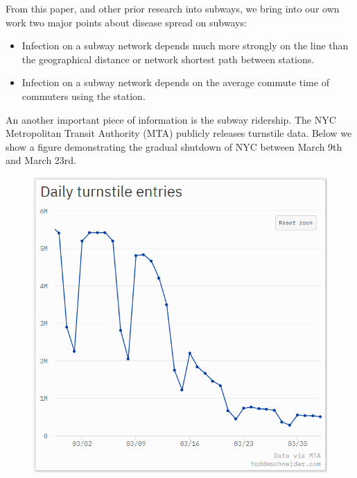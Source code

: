 \documentclass[12pt, a4, epsf] {article}
\theoremstyle{plain}
\theoremstyle{definition}
\begin{document}
From this paper, and other prior research into subways, we bring into our own work two major points about disease spread on subways:\\
\begin{itemize}
	\item Infection on a subway network depends much more strongly on the line than the geographical distance or network shortest path between stations.
	\item Infection on a subway network depends on the average commute time of commuters using the station.
\end{itemize}

An another important piece of information is the subway ridership. The NYC Metropolitan Transit Authority (MTA) publicly releases turnstile data. Below we show a figure demonstrating the gradual shutdown of NYC between March 9th and March 23rd.
\begin{figure}[htbp]
\includegraphics[width = 1.0\textwidth]{Scratch_Visuals/schneider_ridership.png}
\end{figure}
\end{document}

